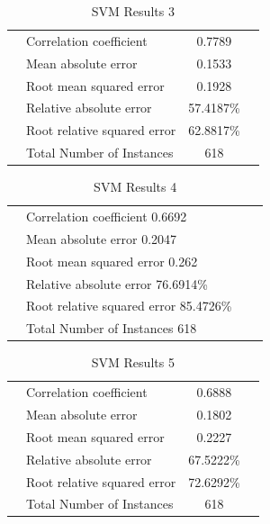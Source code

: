 \begin{table}[ht]
\begin{center}
\begin{tabular}{ ll c r }
\hline
 & Correlation coefficient  &                0.7789 \\
 & Mean absolute error       &               0.1533 \\
 & Root mean squared error   &               0.1928 \\
 & Relative absolute error   &              57.4187\% \\
 & Root relative squared error  &           62.8817\% \\
 & Total Number of Instances     &         618  \\
\hline
\end{tabular}
\caption{SVM Results 3}\label{tab:svm3}
\end{center}
\end{table}

\begin{table}[ht]
\begin{center}
\begin{tabular}{ ll c r }
\hline
 & Correlation coefficient                  0.6692 \\
 & Mean absolute error                      0.2047 \\
 & Root mean squared error                  0.262 \\
 & Relative absolute error                 76.6914\% \\
 & Root relative squared error             85.4726\% \\
 & Total Number of Instances              618  \\
\hline
\end{tabular}
\caption{SVM Results 4}\label{tab:svm4}
\end{center}
\end{table}


\begin{table}[ht]
\begin{center}
\begin{tabular}{ ll c r }
\hline
 & Correlation coefficient   &              0.6888 \\
 & Mean absolute error        &              0.1802 \\
 & Root mean squared error    &              0.2227 \\
 & Relative absolute error    &             67.5222\% \\
 & Root relative squared error &             72.6292\% \\
 & Total Number of Instances   &           618     \\
\hline
\end{tabular}
\caption{SVM Results 5}\label{tab:svm5}
\end{center}
\end{table}

